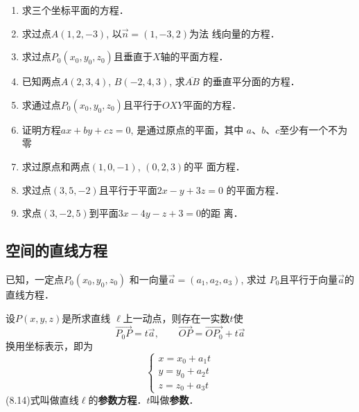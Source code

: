 \begin{ex}
\begin{enumerate}
    \item  求三个坐标平面的方程．
    \item  求过点$A(1,2,-3)$, 以$\vec{n}=(1,-3,2)$为法
    线向量的方程．
    \item  求过点$P_0(x_0,y_0,z_0)$且垂直于$X$轴的平面方程．
    \item  已知两点$A(2,3,4)$, $B(-2,4,3)$, 求$\overline{AB}$
    的垂直平分面的方程．
    \item  求通过点$P_0(x_0,y_0,z_0)$且平行于$OXY$平面的方程．
    \item  证明方程$ax+by+cz=0$, 是通过原点的平面，其中
    $a$、$b$、$c$至少有一个不为零
    \item  求过原点和两点$(1,0,-1)$, $(0,2,3)$的平
    面方程．
    \item  求过点$(3,5,-2)$且平行于平面$2x-y+3z=0$
    的平面方程．
    \item  求点$(3,-2,5)$到平面$3x-4y-z+3=0$的距
    离．
\end{enumerate}
\end{ex}


\subsection{空间的直线方程}
已知，一定点$P_0(x_0,y_0,z_0)$
和一向量$\vec{a}=(a_1,a_2,a_3)$, 求过
$P_0$且平行于向量$\vec{a}$的直线方程．

\begin{figure}[htp]
    \centering
{}
    \caption{}
\end{figure}

设$P(x,y,z)$是所求直线
$\ell$上一动点，则存在一实数$t$使
\[\Vec{P_0P}=t\vec{a},\qquad \Vec{OP}=\Vec{OP_0}+t\vec{a}\]
换用坐标表示，即为
\begin{equation}
    \begin{cases}
        x=x_0+a_1t\\
y = y_0+a_2t\\
z=z_0+a_3t
    \end{cases}
\end{equation}
(8.14)式叫做直线$\ell$的\textbf{参数方程}．$t$叫做\textbf{参数}．

